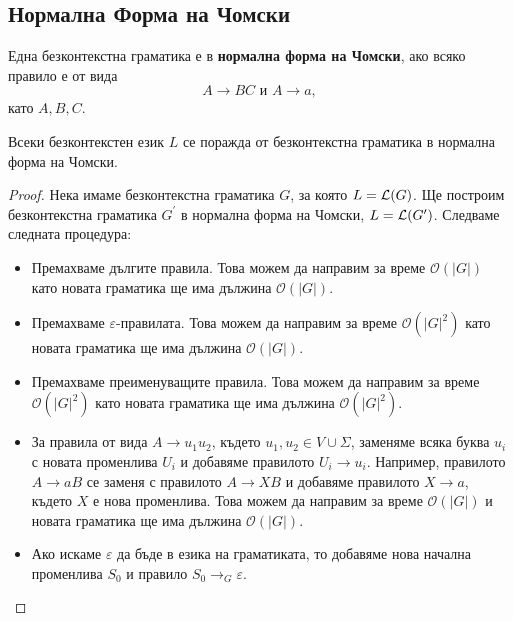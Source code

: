 \subsection{Нормална Форма на Чомски}
Една безконтекстна граматика е в {\bf нормална форма на Чомски}, ако
всяко правило е от вида
\[A \rightarrow BC\mbox{ и }A \rightarrow a,\]
като $A, B, C$.

\begin{framed}
  \begin{thm}
    Всеки безконтекстен език $L$ се поражда от безконтекстна граматика в нормална форма на Чомски.
  \end{thm}
\end{framed}
\begin{proof}
  Нека имаме безконтекстна граматика $G$, за която $L = \mathcal{L}(G)$.
  Ще построим безконтекстна граматика $G^\prime$ в нормална форма на Чомски, $L = \mathcal{L}(G^\prime)$.
  Следваме следната процедура:
  \begin{itemize}
  \item
    Премахваме дългите правила.
    Това можем да направим за време $\mathcal{O}(|G|)$
    като новата граматика ще има дължина $\mathcal{O}(|G|)$.
  \item
    Премахваме $\varepsilon$-правилата.
    Това можем да направим за време $\mathcal{O}(|G|^2)$
    като новата граматика ще има дължина $\mathcal{O}(|G|)$.
  \item
    Премахваме преименуващите правила.
    Това можем да направим за време $\mathcal{O}(|G|^2)$
    като новата граматика ще има дължина $\mathcal{O}(|G|^2)$.
  \item
    За правила от вида $A\to u_1 u_2$, където $u_1, u_2 \in V \cup \Sigma$, 
    заменяме всяка буква $u_i$ с новата променлива $U_i$
    и добавяме правилото $U_i\to u_i$.
    Например, правилото $A \to aB$ се заменя с правилото $A \to XB$ и добавяме правилото $X \to a$,
    където $X$ е нова променлива.
    Това можем да направим за време $\mathcal{O}(|G|)$ и новата граматика ще има дължина $\mathcal{O}(|G|)$.
  \item
    Ако искаме $\varepsilon$ да бъде в езика на граматиката, то добавяме нова начална променлива $S_0$
    и правило $S_0 \to_G \varepsilon$.
  \end{itemize}
\end{proof}

